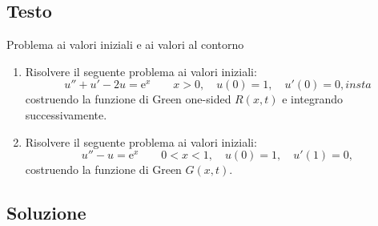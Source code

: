 \documentclass[]{scrartcl}
\begin{document}
\subsection*{Testo} Problema ai valori iniziali e ai valori al contorno

\begin{enumerate}
	\item Risolvere il seguente problema ai valori iniziali:
	\begin{equation}
	u'' + u' -2u = \mathrm{e}^x \qquad x>0, \quad u(0) = 1, \quad u'(0) = 0,
	\label{eq:iniz1}
insta	\end{equation}
	costruendo la funzione di Green one-sided $ R(x,t) $ e integrando successivamente.
	\item Risolvere il seguente problema ai valori iniziali:
	\begin{equation}
	u'' - u = \mathrm{e}^x \qquad 0<x<1, \quad u(0) = 1, \quad u'(1) = 0,
	\label{eq:iniz2}
	\end{equation}
	costruendo la funzione di Green  $ G(x,t) $.
\end{enumerate}

\subsection*{Soluzione}
\end{document}
